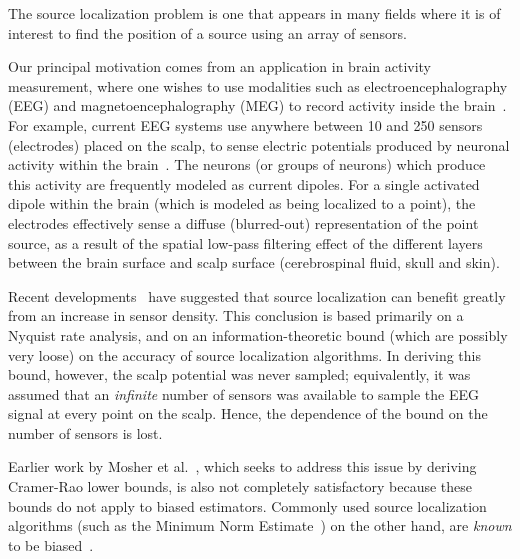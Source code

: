\documentclass[conference]{IEEEtran}
\begin{document}

The source localization problem is one that appears in many fields where it is
of interest to find the position of a source using an array of sensors.

Our principal motivation comes from an application in brain activity
measurement, where one wishes to use modalities such as electroencephalography
(EEG) and magnetoencephalography (MEG) to record activity inside the
brain~\cite{Baillet2001Electromagnetic}.  For example, current EEG systems use
anywhere between 10 and 250 sensors (electrodes) placed on the scalp, to sense
electric potentials produced by neuronal activity within the
brain~\cite{Nunez2006Electric}. The neurons (or groups of neurons) which
produce this activity are frequently modeled as current dipoles. For a single
activated dipole within the brain (which is modeled as being localized to a
point), the electrodes effectively sense a diffuse (blurred-out) representation
of the point source, as a result of the spatial low-pass filtering effect of
the different layers between the brain surface and scalp surface (cerebrospinal
fluid, skull and skin).

Recent developments~\cite{Grover2016Information} have suggested that source
localization can benefit greatly from an increase in sensor density. This
conclusion is based primarily on a Nyquist rate analysis, and on an
information-theoretic bound (which are possibly very loose) on the accuracy of
source localization algorithms. In deriving this bound, however, the scalp
potential was never sampled; equivalently, it was assumed that an
\emph{infinite} number of sensors was available to sample the EEG signal at
every point on the scalp. Hence, the dependence of the bound on the number of
sensors is lost.

Earlier work by Mosher et al.~\cite{Mosher1993Error}, which seeks to address
this issue by deriving Cramer-Rao lower bounds, is also not completely
satisfactory because these bounds do not apply to biased estimators. Commonly
used source localization algorithms (such as the Minimum Norm
Estimate~\cite{Hamalainen1994Interpreting}) on the other hand, are \emph{known}
to be biased~\cite{Lin2006Assessing}.
\end{document}

